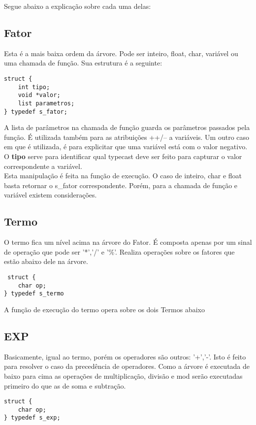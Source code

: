 \documentclass[a4paper,10pt]{article}
\begin{document}
Segue abaixo a explicação sobre cada uma delas:

\subsection{Fator}
Esta é a mais baixa ordem da árvore. Pode ser inteiro, float, char, variável ou uma chamada de função. Sua estrutura é a seguinte:

\begin{lstlisting}
struct {
	int tipo;
	void *valor;
	list parametros;
} typedef s_fator;
\end{lstlisting}

A lista de parâmetros na chamada de função guarda os parâmetros passados pela função. É utilizada também para as atribuições ++/-- a variáveis. Um outro caso em que é utilizada,
é para explicitar que uma variável está com o valor negativo. 
O \textbf{tipo} serve para identificar qual typecast deve ser feito para capturar o valor correspondente a variável.\\
Esta manipulação é feita na função de execução. O caso de inteiro, char e float basta retornar o s_fator correspondente. Porém, para a chamada de função e variável existem
considerações.
\subsection{Termo}

O termo fica um nível acima na árvore do Fator. É composta apenas por um sinal de operação que pode ser '*','/' e '\%'. Realiza operações sobre os fatores que estão abaixo dele na árvore.

\begin{lstlisting}
 struct {
	char op;
} typedef s_termo
\end{lstlisting}

A função de execução do termo opera sobre os dois Termos abaixo 

\subsection{EXP}
Basicamente, igual ao termo, porém os operadores são outros: '+','-'. Isto é feito para resolver o caso da precedência de operadores. Como a árvore é executada de baixo para cima as operações de multiplicação, divisão e mod serão executadas primeiro do que as de soma e subtração.

\begin{lstlisting}
struct {
	char op;
} typedef s_exp;
\end{lstlisting}
\end{document}
